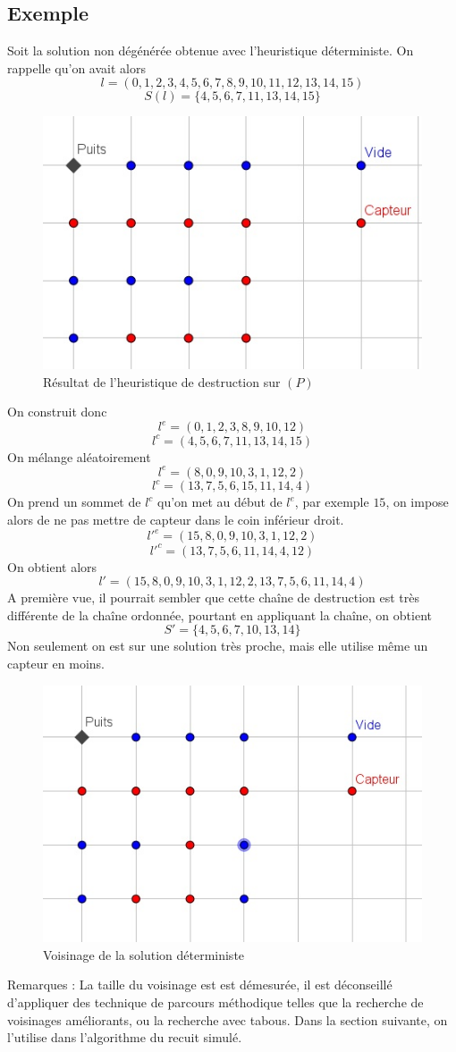 \documentclass[12pt,a4paper]{article}
\begin{document}
\subsection{Exemple}
Soit la solution non dégénérée obtenue avec l'heuristique déterministe.
On rappelle qu'on avait alors
\[l=(0,1,2,3,4,5,6,7,8,9,10,11,12,13,14,15)\] 
\[S(l)=\{4,5,6,7,11,13,14,15\}\]
\begin{figure}[!h]
\center
\includegraphics[scale=1]{Images/4_1_1_naif.jpg}
\caption{Résultat de l'heuristique de destruction sur $(P)$}
\end{figure}

On construit donc 
\[l^e=(0,1,2,3,8,9,10,12)\]
\[l^c=(4,5,6,7,11,13,14,15)\]
On mélange aléatoirement
\[l^e=(8,0,9,10,3,1,12,2)\]
\[l^c=(13,7,5,6,15,11,14,4)\]
On prend un sommet de $l^c$ qu'on met au début de $l^e$, par exemple $15$, on impose alors de ne pas mettre de capteur dans le coin inférieur droit.
\[l'^e=(15,8,0,9,10,3,1,12,2)\]
\[l'^c=(13,7,5,6,11,14,4,12)\]
On obtient alors 
\[l'=(15,8,0,9,10,3,1,12,2,13,7,5,6,11,14,4)\]
A première vue, il pourrait sembler que cette chaîne de destruction est très différente de la chaîne ordonnée, pourtant en appliquant la chaîne, on obtient
\[S'=\{4,5,6,7,10,13,14\}\]
Non seulement on est sur une solution très proche, mais elle utilise même un capteur en moins.
\begin{figure}[!h]
\center
\includegraphics[scale=1]{Images/4_1_1_neigh.jpg}
\caption{Voisinage de la solution déterministe}
\end{figure}

Remarques : La taille du voisinage est est démesurée, il est déconseillé d'appliquer des technique de parcours méthodique telles que la recherche de voisinages améliorants, ou la recherche avec tabous. Dans la section suivante, on l'utilise dans l'algorithme du recuit simulé.
\end{document}
